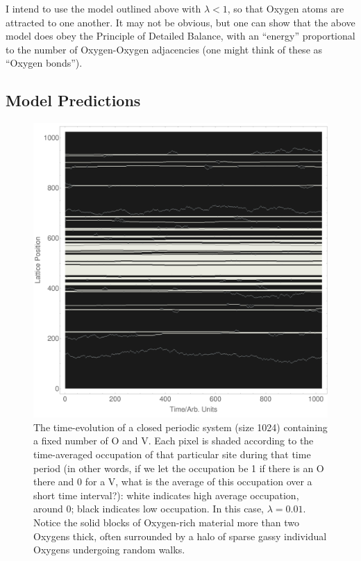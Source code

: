 I intend to use the model outlined above with $\lambda<1$, so that Oxygen atoms are attracted to one another. It may not be obvious, but one can show that the above model does obey the Principle of Detailed Balance, with an ``energy''
proportional to the number of Oxygen-Oxygen adjacencies (one might think of these as ``Oxygen bonds'').

\subsection{Model Predictions}
\begin{figure}[h!]
\centering
 \includegraphics[width=\textwidth]{../tex-src/images/periodicExample}
 \caption{The time-evolution of a closed periodic system (size 1024) containing a fixed number of O and V. Each pixel is shaded according to the time-averaged occupation of that particular site during that time period (in other words,
 if we let the occupation be 1 if there is an O there and 0 for a V, what is the average of this occupation over a short time interval?):
 white indicates high average occupation, around 0; black indicates low occupation. In this case, $\lambda=0.01$. Notice the solid blocks of Oxygen-rich material more than two Oxygens thick, often surrounded by a halo of sparse gassy individual Oxygens undergoing random walks.}
 \label{fig: periodicExample}
\end{figure}


